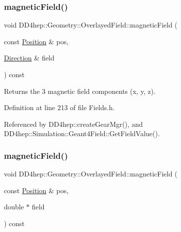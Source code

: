 \subsubsection{\texorpdfstring{magnetic\+Field()}{magneticField()}\hspace{0.1cm}{\footnotesize\ttfamily [1/3]}}
{\footnotesize\ttfamily void D\+D4hep\+::\+Geometry\+::\+Overlayed\+Field\+::magnetic\+Field (\begin{DoxyParamCaption}\item[{const \hyperlink{namespace_d_d4hep_1_1_geometry_a55083902099d03506c6db01b80404900}{Position} \&}]{pos,  }\item[{\hyperlink{namespace_d_d4hep_1_1_geometry_a56730a0ddb9f3f089c415cd693bd7c19}{Direction} \&}]{field }\end{DoxyParamCaption}) const\hspace{0.3cm}{\ttfamily [inline]}}



Returns the 3 magnetic field components (x, y, z). 



Definition at line 213 of file Fields.\+h.



Referenced by D\+D4hep\+::create\+Gear\+Mgr(), and D\+D4hep\+::\+Simulation\+::\+Geant4\+Field\+::\+Get\+Field\+Value().

\hypertarget{class_d_d4hep_1_1_geometry_1_1_overlayed_field_a6987ef7388a5888d762a08ef0dd64a0f}{}\label{class_d_d4hep_1_1_geometry_1_1_overlayed_field_a6987ef7388a5888d762a08ef0dd64a0f} 
\subsubsection{\texorpdfstring{magnetic\+Field()}{magneticField()}\hspace{0.1cm}{\footnotesize\ttfamily [2/3]}}
{\footnotesize\ttfamily void D\+D4hep\+::\+Geometry\+::\+Overlayed\+Field\+::magnetic\+Field (\begin{DoxyParamCaption}\item[{const \hyperlink{namespace_d_d4hep_1_1_geometry_a55083902099d03506c6db01b80404900}{Position} \&}]{pos,  }\item[{double $\ast$}]{field }\end{DoxyParamCaption}) const\hspace{0.3cm}{\ttfamily [inline]}}



